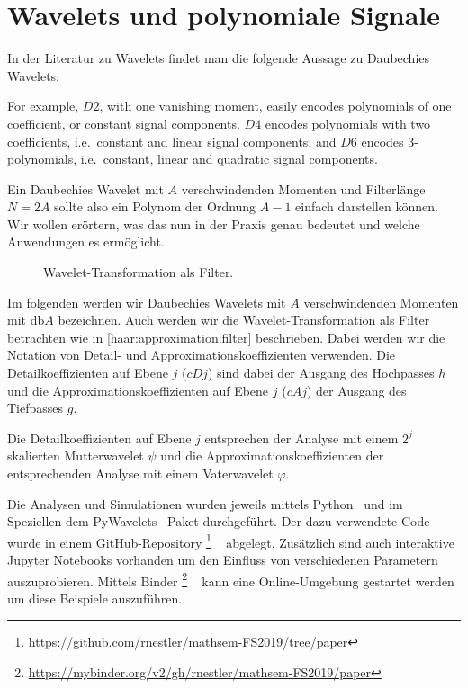 %
%
%
\chapter{Wavelets und polynomiale Signale\label{chapter:thema}}
\begin{refsection}

In der Literatur zu Wavelets findet man die folgende Aussage zu Daubechies
Wavelets:
\begin{displayquote}
For example, $D2$, with one vanishing moment, easily encodes polynomials of one
coefficient, or constant signal components. $D4$ encodes polynomials with two
coefficients, i.e.\ constant and linear signal components; and $D6$ encodes
3-polynomials, i.e.\ constant, linear and quadratic signal components.
\end{displayquote}
Ein Daubechies Wavelet mit $A$ verschwindenden Momenten und Filterlänge $N=2A$
sollte also ein Polynom der Ordnung $A-1$ einfach darstellen können. Wir wollen
erörtern, was das nun in der Praxis genau bedeutet und welche Anwendungen es
ermöglicht.

\begin{figure}
    \centering
    
    \caption{Wavelet-Transformation als Filter.\label{polynomials:filter}}
\end{figure}

Im folgenden werden wir Daubechies Wavelets mit $A$ verschwindenden Momenten
mit db$A$ bezeichnen. Auch werden wir die Wavelet-Transformation als Filter
betrachten wie in \cref{haar:approximation:filter} beschrieben. Dabei werden
wir die Notation von Detail- und Approximationskoeffizienten verwenden. Die
Detailkoeffizienten auf Ebene $j$ ($cDj$) sind dabei der Ausgang des Hochpasses
$h$ und die Approximationskoeffizienten auf Ebene $j$ ($cAj$) der Ausgang des
Tiefpasses $g$.

Die Detailkoeffizienten auf Ebene $j$ entsprechen der Analyse mit einem $2^j$
skalierten Mutterwavelet $\psi$ und die Approximationskoeffizienten der
entsprechenden Analyse mit einem Vaterwavelet $\varphi$.

Die Analysen und Simulationen wurden jeweils mittels Python~\cite{python} und im
Speziellen dem PyWavelets~\cite{gregory_r_lee_2019_2634243} Paket durchgeführt.
Der dazu verwendete Code wurde in einem GitHub-Repository%
\footnote{\url{https://github.com/rnestler/mathsem-FS2019/tree/paper}}%
~\cite{polynomials:repo}
abgelegt. Zusätzlich sind auch interaktive Jupyter Notebooks vorhanden um den
Einfluss von verschiedenen Parametern auszuprobieren. Mittels
Binder%
\footnote{\url{https://mybinder.org/v2/gh/rnestler/mathsem-FS2019/paper}}%
~\cite{project_jupyter-proc-scipy-2018}
kann eine Online-Umgebung gestartet werden um diese Beispiele auszuführen.


\end{refsection}
